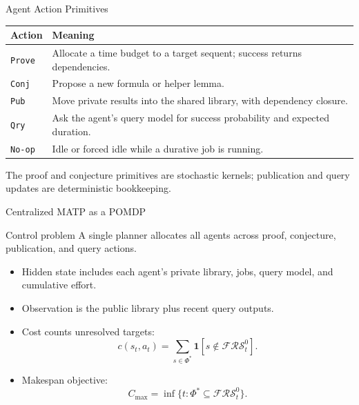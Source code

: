 \documentclass[10pt,aspectratio=169]{beamer}
\newcommand{\FRS}{\mathcal{FRS}}
\begin{document}
\begin{frame}{Agent Action Primitives}
\small
\begin{tabular}{p{}p{}}
\toprule
\textbf{Action} & \textbf{Meaning} \\
\midrule
\texttt{Prove} & Allocate a time budget to a target sequent; success returns dependencies. \\
\texttt{Conj} & Propose a new formula or helper lemma. \\
\texttt{Pub} & Move private results into the shared library, with dependency closure. \\
\texttt{Qry} & Ask the agent's query model for success probability and expected duration. \\
\texttt{No-op} & Idle or forced idle while a durative job is running. \\
\bottomrule
\end{tabular}

\vspace{0.8em}
The proof and conjecture primitives are stochastic kernels; publication and query updates are deterministic bookkeeping.
\end{frame}

\begin{frame}{Centralized MATP as a POMDP}
\small
\begin{block}{Control problem}
A single planner allocates all agents across proof, conjecture, publication, and query actions.
\end{block}

\begin{itemize}
  \item Hidden state includes each agent's private library, jobs, query model, and cumulative effort.
  \item Observation is the public library plus recent query outputs.
  \item Cost counts unresolved targets:
  \[
  c(s_t,a_t)=\sum_{s\in\Phi^*}\mathbf{1}[s\notin \FRS^0_t].
  \]
  \item Makespan objective:
  \[
  C_{\max}=\inf\{t:\Phi^*\subseteq \FRS^0_t\}.
  \]
\end{itemize}
\end{frame}
\end{document}
